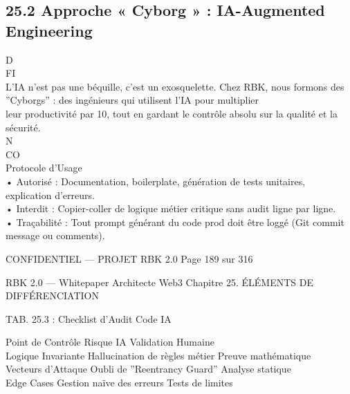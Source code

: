 \documentclass[12pt,landscape,a4paper]{article}
\newenvironment{confidential}
{\begin{tcolorbox}[
    colback=rbkred!5!white,
    colframe=rbkred!75!black,
    title=CONFIDENTIEL,
    fonttitle=\bfseries\color{white},
    coltitle=rbkred!75!black,
    breakable,
    enhanced,
    frame hidden,
    borderline west={2pt}{0pt}{rbkred!75!black}
]}
{\end{tcolorbox}}
\begin{document}
\subsection{25.2 Approche « Cyborg » : IA-Augmented Engineering}
\vspace{0.5em}
\vspace{0.5em}
\vspace{0.5em}
\vspace{0.5em}
D\\
FI\\
L’IA n’est pas une béquille, c’est un exosquelette. Chez RBK, nous formons des ”Cyborgs” : des ingénieurs qui utilisent l’IA pour multiplier\\
leur productivité par 10, tout en gardant le contrôle absolu sur la qualité et la sécurité.\\
N\\
CO\\
Protocole d’Usage\\
\vspace{0.5em}
• Autorisé : Documentation, boilerplate, génération de tests unitaires, explication d’erreurs.\\
\vspace{0.5em}
• Interdit : Copier-coller de logique métier critique sans audit ligne par ligne.\\
\vspace{0.5em}
• Traçabilité : Tout prompt générant du code prod doit être loggé (Git commit message ou comments).\\
\vspace{0.5em}
\vspace{0.5em}
\vspace{0.5em}
\vspace{0.5em}
\begin{confidential}CONFIDENTIEL — PROJET RBK 2.0                                  Page 189 sur 316\end{confidential}
RBK 2.0 — Whitepaper Architecte Web3                                                             Chapitre 25. ÉLÉMENTS DE DIFFÉRENCIATION\\
\vspace{0.5em}
\vspace{0.5em}
\begin{center}\begin{tabular}TAB. 25.3 : Checklist d’Audit Code IA\end{tabular}\end{center}
\vspace{0.5em}
\vspace{0.5em}
Point de Contrôle Risque IA                       Validation Humaine\\
Logique Invariante Hallucination de règles métier Preuve mathématique\\
Vecteurs d’Attaque Oubli de ”Reentrancy Guard” Analyse statique\\
Edge Cases         Gestion naïve des erreurs      Tests de limites\\
\vspace{0.5em}
\vspace{0.5em}
\vspace{0.5em}
\vspace{0.5em}
\end{document}

